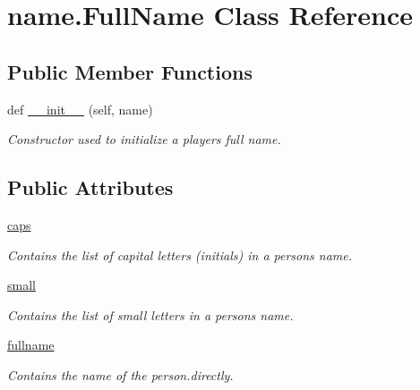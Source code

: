 \hypertarget{classname_1_1FullName}{}\section{name.\+Full\+Name Class Reference}
\label{classname_1_1FullName}
\subsection*{Public Member Functions}
\begin{DoxyCompactItemize}
\item 
def \hyperlink{classname_1_1FullName_a28652799b3836b5dbad3504fdc70c34c}{\+\_\+\+\_\+init\+\_\+\+\_\+} (self, name)
\begin{DoxyCompactList}\small\item\em Constructor used to initialize a player\textquotesingle{}s full name. \end{DoxyCompactList}\end{DoxyCompactItemize}
\subsection*{Public Attributes}
\begin{DoxyCompactItemize}
\item 
\mbox{\label{classname_1_1FullName_a1396db512f0e5045ea16903b4076c42c}} 
\hyperlink{classname_1_1FullName_a1396db512f0e5045ea16903b4076c42c}{caps}
\begin{DoxyCompactList}\small\item\em Contains the list of capital letters (initials) in a person\textquotesingle{}s name. \end{DoxyCompactList}\item 
\mbox{\label{classname_1_1FullName_a0802709ba7dc9d56967101dc31e62cd1}} 
\hyperlink{classname_1_1FullName_a0802709ba7dc9d56967101dc31e62cd1}{small}
\begin{DoxyCompactList}\small\item\em Contains the list of small letters in a person\textquotesingle{}s name. \end{DoxyCompactList}\item 
\mbox{\label{classname_1_1FullName_ab0b7ed4fb596e48365b6bb3a23140449}} 
\hyperlink{classname_1_1FullName_ab0b7ed4fb596e48365b6bb3a23140449}{fullname}
\begin{DoxyCompactList}\small\item\em Contains the name of the person.\+directly. \end{DoxyCompactList}\end{DoxyCompactItemize}


